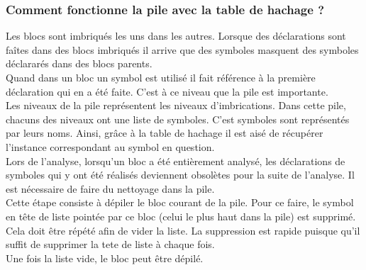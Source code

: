 \documentclass{../../res/univ-projet}
\begin{document}
      
    \subsubsection{Comment fonctionne la pile avec la table de hachage ?}
      Les blocs sont imbriqués les uns dans les autres. Lorsque des déclarations sont faîtes dans des blocs imbriqués il arrive que des symboles masquent des symboles déclararés dans des blocs parents.\\
      Quand dans un bloc un symbol est utilisé il fait référence à la première déclaration qui en a été faite. C'est à ce niveau que la pile est importante.\\

      Les niveaux de la pile représentent les niveaux d'imbrications. Dans cette pile, chacuns des niveaux ont une liste de symboles. C'est symboles sont représentés par leurs noms. Ainsi, grâce à la table de hachage il est aisé de récupérer l'instance correspondant au symbol en question.\\

      Lors de l'analyse, lorsqu'un bloc a été entièrement analysé, les déclarations de symboles qui y ont été réalisés deviennent obsolètes pour la suite de l'analyse. Il est nécessaire de faire du nettoyage dans la pile.\\

      Cette étape consiste à dépiler le bloc courant de la pile. Pour ce faire, le symbol en tête de liste pointée par ce bloc (celui le plus haut dans la pile) est supprimé. Cela doit être répété afin de vider la liste. La suppression est rapide puisque qu'il suffit de supprimer la tete de liste à chaque fois.\\
      Une fois la liste vide, le bloc peut être dépilé.

      \newpage
\end{document}
